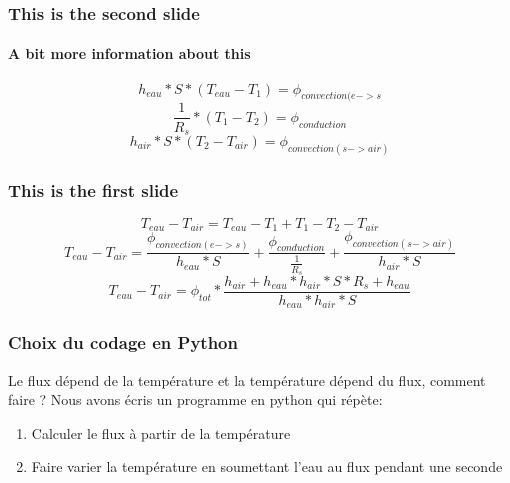 \documentclass{beamer}
\begin{document}
  \begin{frame}
    \frametitle{This is the second slide}
    \framesubtitle{A bit more information about this}
    \[h_{eau}*S*(T_{eau} - T_{1}) = \phi_{convection(e->s}\]
    \[\frac{1}{R_{s}} * (T_{1} - T_{2}) = \phi_{conduction}\]
    \[h_{air}*S*(T_{2} - T_{air}) = \phi_{convection(s->air)}\]
  \end{frame}
  \begin{frame}
    \frametitle{This is the first slide}
    \[T_{eau} - T_{air} = T_{eau} - T_{1} + T_{1} - T_{2} - T_{air}\]
    \[T_{eau} - T_{air} = \frac{\phi_{convection(e->s)}}{h_{eau}*S} + \frac{\phi_{conduction}}{\frac{1}{R_{s}}} + \frac{\phi_{convection(s->air)}}{h_{air}*S} \]
    \[T_{eau} - T_{air} = \phi_{tot} * \frac{h_{air} + h_{eau}*h_{air}*S*R_{s} + h_{eau}}{h_{eau}*h_{air}*S}\]
  \end{frame}
  \begin{frame}
   \frametitle{Choix du codage en Python}
   Le flux dépend de la température et la température dépend du flux, comment faire ?
Nous avons écris un programme en python qui répète:
    \begin{enumerate}
     \item Calculer le flux à partir de la température
     \item Faire varier la température en soumettant l’eau au flux pendant une seconde

    \end{enumerate}

  \end{frame}

\end{document}
